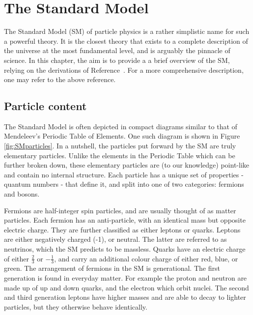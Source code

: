 
\chapter{The Standard Model}
\label{chap:theory}

The Standard Model (SM) of particle physics is a rather simplistic name for such a powerful theory. It is the closest theory that exists to a complete description of the universe at the most fundamental level, and is arguably the pinnacle of science. In this chapter, the aim is to provide a a brief overview of the SM, relying on the derivations of Reference~\cite{Griffiths:2008zz}. For a more comprehensive description, one may refer to the above reference.

\section{Particle content}
\label{sec:particlecontent}

The Standard Model is often depicted in compact diagrams similar to that of Mendeleev's Periodic Table of Elements. One such diagram is shown in Figure \ref{fig:SMparticles}. In a nutshell, the particles put forward by the SM are truly elementary particles. Unlike the elements in the Periodic Table which can be further broken down, these elementary particles are (to our knowledge) point-like and contain no internal structure. Each particle has a unique set of properties - quantum numbers - that define it, and split into one of two categories: fermions and bosons. 

Fermions are half-integer spin particles, and are usually thought of as matter particles. Each fermion has an anti-particle, with an identical mass but opposite electric charge. They are further classified as either leptons or quarks. Leptons are either negatively charged (-1), or neutral. The latter are referred to as neutrinos, which the SM predicts to be massless. Quarks have an electric charge of either $\frac{2}{3}$ or $-\frac{1}{3}$, and carry an additional colour charge of either red, blue, or green. The arrangement of fermions in the SM is generational. The first generation is found in everyday matter. For example the proton and neutron are made up of up and down quarks, and the electron which orbit nuclei. The second and third generation leptons have higher masses and are able to decay to lighter particles, but they otherwise behave identically. 

